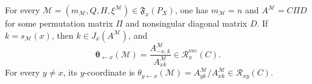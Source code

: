 For every \(\mathcal M=(m_{\mathcal M},Q,H,\xi^{\mathcal M})\in\mathfrak F_x(P_X)\), one has \(m_{\mathcal M}=n\) and \(A^{\mathcal M}=C\Pi D\) for some permutation matrix \(\Pi\) and nonsingular diagonal matrix \(D\). If \(k=s_{\mathcal M}(x)\), then \(k\in J_x(A^{\mathcal M})\), and
\[
\boldsymbol\theta_{\leftarrow x}(\mathcal M)
=\frac{A^{\mathcal M}_{-x,k}}{A^{\mathcal M}_{xk}}
\in\mathcal R_x^{\mathrm{vec}}(C).
\]
For every \(y\ne x\), its \(y\)-coordinate is \(\theta_{y\leftarrow x}(\mathcal M)=A^{\mathcal M}_{yk}/A^{\mathcal M}_{xk}\in\mathcal R_{xy}(C)\).